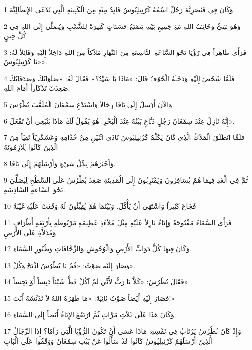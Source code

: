 \par 1 وَكَانَ فِي قَيْصَرِيَّةَ رَجُلٌ اسْمُهُ كَرْنِيلِيُوسُ قَائِدُ مِئَةٍ مِنَ الْكَتِيبَةِ الَّتِي تُدْعَى الإِيطَالِيَّةَ.
\par 2 وَهُوَ تَقِيٌّ وَخَائِفُ اللهِ مَعَ جَمِيعِ بَيْتِهِ يَصْنَعُ حَسَنَاتٍ كَثِيرَةً لِلشَّعْبِ وَيُصَلِّي إِلَى اللهِ فِي كُلِّ حِينٍ.
\par 3 فَرَأَى ظَاهِراً فِي رُؤْيَا نَحْوَ السَّاعَةِ التَّاسِعَةِ مِنَ النَّهَارِ مَلاَكاً مِنَ اللهِ دَاخِلاً إِلَيْهِ وَقَائِلاً لَهُ: «يَا كَرْنِيلِيُوسُ».
\par 4 فَلَمَّا شَخَصَ إِلَيْهِ وَدَخَلَهُ الْخَوْفُ قَالَ: «مَاذَا يَا سَيِّدُ؟» فَقَالَ لَهُ: «صَلَوَاتُكَ وَصَدَقَاتُكَ صَعِدَتْ تَذْكَاراً أَمَامَ اللهِ.
\par 5 وَالآنَ أَرْسِلْ إِلَى يَافَا رِجَالاً وَاسْتَدْعِ سِمْعَانَ الْمُلَقَّبَ بُطْرُسَ.
\par 6 إِنَّهُ نَازِلٌ عِنْدَ سِمْعَانَ رَجُلٍ دَبَّاغٍ بَيْتُهُ عِنْدَ الْبَحْرِ. هُوَ يَقُولُ لَكَ مَاذَا يَنْبَغِي أَنْ تَفْعَلَ».
\par 7 فَلَمَّا انْطَلَقَ الْمَلاَكُ الَّذِي كَانَ يُكَلِّمُ كَرْنِيلِيُوسَ نَادَى اثْنَيْنِ مِنْ خُدَّامِهِ وَعَسْكَرِيّاً تَقِيّاً مِنَ الَّذِينَ كَانُوا يُلاَزِمُونَهُ
\par 8 وَأَخْبَرَهُمْ بِكُلِّ شَيْءٍ وَأَرْسَلَهُمْ إِلَى يَافَا.
\par 9 ثُمَّ فِي الْغَدِ فِيمَا هُمْ يُسَافِرُونَ وَيَقْتَرِبُونَ إِلَى الْمَدِينَةِ صَعِدَ بُطْرُسُ عَلَى السَّطْحِ لِيُصَلِّيَ نَحْوَ السَّاعَةِ السَّادِسَةِ.
\par 10 فَجَاعَ كَثِيراً وَاشْتَهَى أَنْ يَأْكُلَ. وَبَيْنَمَا هُمْ يُهَيِّئُونَ لَهُ وَقَعَتْ عَلَيْهِ غَيْبَةٌ
\par 11 فَرَأَى السَّمَاءَ مَفْتُوحَةً وَإِنَاءً نَازِلاً عَلَيْهِ مِثْلَ مُلاَءَةٍ عَظِيمَةٍ مَرْبُوطَةٍ بِأَرْبَعَةِ أَطْرَافٍ وَمُدَلاَّةٍ عَلَى الأَرْضِ.
\par 12 وَكَانَ فِيهَا كُلُّ دَوَابِّ الأَرْضِ وَالْوُحُوشِ وَالزَّحَّافَاتِ وَطُيُورِ السَّمَاءِ.
\par 13 وَصَارَ إِلَيْهِ صَوْتٌ: «قُمْ يَا بُطْرُسُ اذْبَحْ وَكُلْ».
\par 14 فَقَالَ بُطْرُسُ: «كَلاَّ يَا رَبُّ لأَنِّي لَمْ آكُلْ قَطُّ شَيْئاً دَنِساً أَوْ نَجِساً».
\par 15 فَصَارَ إِلَيْهِ أَيْضاً صَوْتٌ ثَانِيَةً: «مَا طَهَّرَهُ اللهُ لاَ تُدَنِّسْهُ أَنْتَ!»
\par 16 وَكَانَ هَذَا عَلَى ثَلاَثِ مَرَّاتٍ ثُمَّ ارْتَفَعَ الإِنَاءُ أَيْضاً إِلَى السَّمَاءِ.
\par 17 وَإِذْ كَانَ بُطْرُسُ يَرْتَابُ فِي نَفْسِهِ: مَاذَا عَسَى أَنْ تَكُونَ الرُّؤْيَا الَّتِي رَآهَا؟ إِذَا الرِّجَالُ الَّذِينَ أَرْسَلَهُمْ كَرْنِيلِيُوسُ كَانُوا قَدْ سَأَلُوا عَنْ بَيْتِ سِمْعَانَ وَوَقَفُوا عَلَى الْبَابِ
